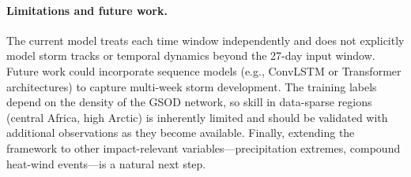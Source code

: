 \documentclass{article}
\begin{document}
\paragraph{Limitations and future work.}
The current model treats each time window independently and does not explicitly model storm tracks or temporal dynamics beyond the 27-day input window. Future work could incorporate sequence models (e.g., ConvLSTM or Transformer architectures) to capture multi-week storm development. The training labels depend on the density of the GSOD network, so skill in data-sparse regions (central Africa, high Arctic) is inherently limited and should be validated with additional observations as they become available. Finally, extending the framework to other impact-relevant variables---precipitation extremes, compound heat-wind events---is a natural next step.



\end{document}
